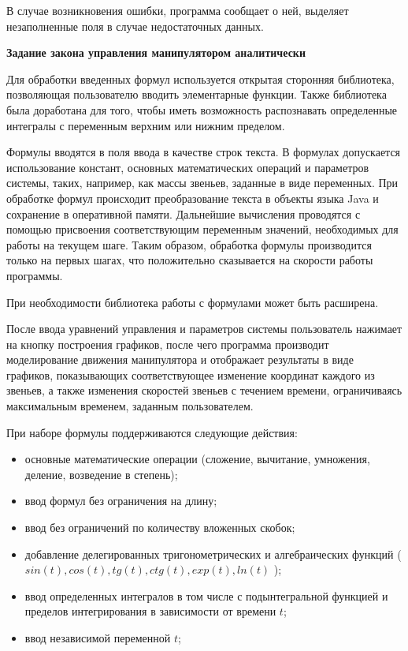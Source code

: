 В случае возникновения ошибки, программа сообщает о ней, выделяет незаполненные поля в случае недостаточных данных.
\par
\textbf{Задание закона управления манипулятором аналитически}

Для обработки введенных формул используется открытая сторонняя библиотека, позволяющая пользователю вводить элементарные функции. Также библиотека была доработана для того, чтобы иметь возможность распознавать определенные интегралы с переменным верхним или нижним пределом.

Формулы вводятся в поля ввода в качестве строк текста. В формулах допускается использование констант, основных математических операций и параметров системы, таких, например, как массы звеньев, заданные в виде переменных. При обработке формул происходит преобразование текста в объекты языка Java и сохранение в оперативной памяти. Дальнейшие вычисления проводятся с помощью присвоения соответствующим переменным значений, необходимых для работы на текущем шаге. Таким образом, обработка формулы производится только на первых шагах, что положительно сказывается на скорости работы программы.

При необходимости библиотека работы с формулами может быть расширена.

После ввода уравнений управления и параметров системы пользователь нажимает на кнопку построения графиков, после чего программа производит моделирование движения манипулятора и отображает результаты в виде графиков, показывающих соответствующее изменение координат каждого из звеньев, а также изменения скоростей звеньев с течением времени, ограничиваясь максимальным временем, заданным пользователем.

При наборе формулы поддерживаются следующие действия:
\begin{itemize}
\item{основные математические операции (сложение, вычитание, умножения, деление, возведение в степень);}
\item{ввод формул без ограничения на длину;}
\item{ввод без ограничений по количеству вложенных скобок;}
\item{добавление делегированных тригонометрических и алгебраических функций ($sin(t), cos(t), tg(t), ctg(t), exp(t), ln(t)$ );}
\item{ввод определенных интегралов в том числе с подынтегральной функцией и пределов интегрирования в зависимости от времени $t$;}
\item{ввод независимой переменной $t$;}
\end{itemize}
